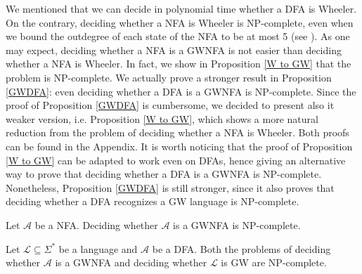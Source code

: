 \documentclass[runningheads]{llncs}
\begin{document}
We mentioned that we can decide in polynomial time whether a DFA is Wheeler. On the contrary, deciding whether a NFA is Wheeler is NP-complete, even when we bound the outdegree of each state of the NFA to be at most 5 (see \cite{NP}). 
As one may expect, deciding whether a NFA is a GWNFA is not easier than deciding whether a NFA is Wheeler. In fact, we show in Proposition \ref{W to GW} that the problem is NP-complete. 
We actually prove a stronger result in Proposition \ref{GWDFA}: even deciding whether a DFA is a GWNFA is NP-complete. 
Since the proof of Proposition \ref{GWDFA} is cumbersome, we decided to present also it weaker version, i.e. Proposition \ref{W to GW}, which shows a more natural reduction from the problem of deciding whether a NFA is Wheeler. Both proofs can be found in the Appendix.
It is worth noticing that the proof of Proposition \ref{W to GW} can be adapted to work even on DFAs, hence giving an alternative way to prove that deciding whether a DFA is a GWNFA is NP-complete. Nonetheless, Proposition \ref{GWDFA} is still stronger, since it also proves that deciding whether a DFA recognizes a GW language is NP-complete.

\begin{proposition}
\label{W to GW}
Let $\mathcal A$ be a NFA. Deciding whether $\mathcal A$ is a GWNFA is NP-complete.
\end{proposition}

\begin{proposition}
\label{GWDFA}
Let $\mathcal L\subseteq \Sigma^*$ be a language and $\mathcal A$ be a DFA. Both the problems of deciding whether $\mathcal A$ is a GWNFA and deciding whether $\mathcal L$ is GW are NP-complete.
\end{proposition}
\end{document}
